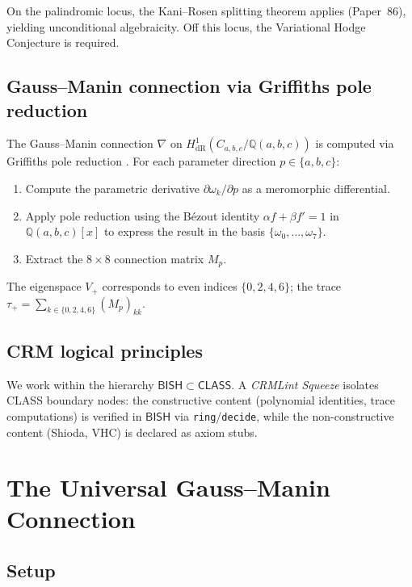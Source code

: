 \documentclass[11pt,a4paper]{article}
\theoremstyle{definition}
\theoremstyle{remark}
\newcommand{\QQ}{\mathbb{Q}}
\newcommand{\BISH}{\mathsf{BISH}}
\newcommand{\CLASS}{\mathsf{CLASS}}
\begin{document}
On the palindromic locus, the Kani--Rosen splitting theorem \cite{Kani1989} applies
(Paper~86), yielding unconditional algebraicity.
Off this locus, the Variational Hodge Conjecture is required.

\subsection{Gauss--Manin connection via Griffiths pole reduction}

The Gauss--Manin connection $\nabla$ on $H^1_{\mathrm{dR}}(C_{a,b,c}/\QQ(a,b,c))$
\cite{Deligne1971}
is computed via Griffiths pole reduction \cite{Griffiths1969}.
For each parameter direction $p \in \{a,b,c\}$:
\begin{enumerate}[nosep]
  \item Compute the parametric derivative $\partial \omega_k / \partial p$
        as a meromorphic differential.
  \item Apply pole reduction using the B\'ezout identity $\alpha f + \beta f' = 1$
        in $\QQ(a,b,c)[x]$ to express the result in the basis $\{\omega_0, \ldots, \omega_7\}$.
  \item Extract the $8 \times 8$ connection matrix $M_p$.
\end{enumerate}
The eigenspace $V_+$ corresponds to even indices $\{0, 2, 4, 6\}$;
the trace $\tau_+ = \sum_{k \in \{0,2,4,6\}} (M_p)_{kk}$.

\subsection{CRM logical principles}

We work within the hierarchy $\BISH \subset \CLASS$.
A \emph{CRMLint Squeeze} isolates CLASS boundary nodes:
the constructive content (polynomial identities, trace computations) is
verified in $\BISH$ via \texttt{ring}/\texttt{decide}, while the
non-constructive content (Shioda, VHC) is declared as axiom stubs.


\section{The Universal Gauss--Manin Connection}

\subsection{Setup}
\end{document}
